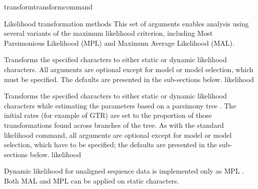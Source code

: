 \begin{command}{transform}{transformcommand}
\begin{arguments}
\begin{argumentgroup}
        \end{argumentgroup}
   




        \begin{argumentgroup}{Likelihood transformation methods}
            This set of arguments enables analysis using several variants of the
            maximum likelihood criterion, including Most Parsimonious Likelihood (MPL)
            and Maximum Average Likelihood (MAL). 

                {Transforms the specified characters to either static or dynamic
                likelihood characters. All arguments are optional except for model or model selection, 
                which must  be specified.  The defaults are presented in the sub-sections below.}
                {likelihood}

                {Transforms the specified characters to either static or dynamic
                likelihood characters while estimating the parameters based on a
                parsimony tree \cite{wheeler2013}. The initial rates (for example of 
                GTR) are set to the proportion of those transformations found
                across branches of the tree. As with the standard likelihood command,
                all arguments are optional except for model  or model selection, which 
                have to be specified; the defaults are presented in the sub-sections below.}
                {likelihood}

            \begin{statement}
                Dynamic likelihood for unaligned sequence data is
                implemented only as MPL \cite{barryandhartigan1987}. Both MAL and
                MPL can be applied on static characters.
            \end{statement}


\end{argumentgroup}
\end{arguments}
\end{command}
